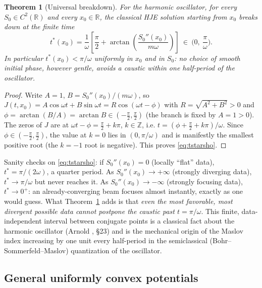 \documentclass[11pt]{article}
\theoremstyle{plain}
\newtheorem{theorem}{Theorem}[section]
\theoremstyle{definition}
\theoremstyle{remark}
\begin{document}
\begin{theorem}[Universal breakdown]
\label{thm:sho}
For the harmonic oscillator, for \emph{every} $S_0\in C^2(\mathbb{R})$ and
    \emph{every} $x_0\in\mathbb{R}$, the classical HJE solution starting from
    $x_0$ breaks down at the finite time
\begin{equation}
t^\ast(x_0) = \frac{1}{\omega}\left[\frac{\pi}{2} + \arctan\!\left(\frac{S_0''(x_0)}{m\omega}\right)\right] \ \in\ \Big(0,\ \frac{\pi}{\omega}\Big).
\label{eq:tstarsho}
\end{equation}
In particular $t^\ast(x_0) < \pi/\omega$ uniformly in $x_0$ and in $S_0$: no choice of smooth initial phase, however gentle, avoids a caustic within one half-period of the oscillator.
\end{theorem}

\begin{proof}
Write $A=1$, $B=S_0''(x_0)/(m\omega)$, so $J(t,x_0)=A\cos\omega t+B\sin\omega t
    = R\cos(\omega t-\phi)$ with $R=\sqrt{A^2+B^2}>0$ and
    $\phi=\arctan(B/A)=\arctan B\in(-\tfrac\pi2,\tfrac\pi2)$ (the branch is
    fixed by $A=1>0$). The zeros of $J$ are at $\omega t-\phi=\tfrac\pi2+k\pi$,
    $k\in\mathbb Z$, i.e. $t=(\phi+\tfrac\pi2+k\pi)/\omega$. Since
    $\phi\in(-\tfrac\pi2,\tfrac\pi2)$, the value at $k=0$ lies in
    $(0,\pi/\omega)$ and is manifestly the smallest positive root (the $k=-1$
    root is negative). This proves \eqref{eq:tstarsho}.
\end{proof}

Sanity checks on \eqref{eq:tstarsho}: if $S_0''(x_0)=0$ (locally ``flat''
data), $t^\ast=\pi/(2\omega)$, a quarter period. As $S_0''(x_0)\to+\infty$
(strongly diverging data), $t^\ast\to\pi/\omega$ but never reaches it. As
$S_0''(x_0)\to-\infty$ (strongly focusing data), $t^\ast\to0^+$: an
already-converging beam focuses almost instantly, exactly as one would guess.
What Theorem~\ref{thm:sho} adds is that \emph{even the most favorable, most
divergent possible data cannot postpone the caustic past $t=\pi/\omega$}. This
finite, data-independent interval between conjugate points is a classical fact
about the harmonic oscillator (Arnold \cite{Arnold}, \S23) and is the
mechanical origin of the Maslov index increasing by one unit every half-period
in the semiclassical (Bohr--Sommerfeld--Maslov) quantization of the oscillator.

\subsection{General uniformly convex potentials}
\end{document}
